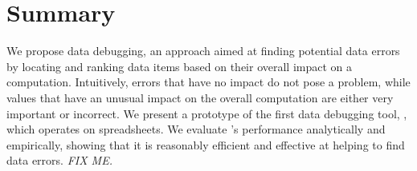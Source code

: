 \section{Summary}

We propose data debugging, an approach aimed at
finding potential data errors by locating and ranking data items based on their
overall impact on a computation. Intuitively, errors that have no
impact do not pose a problem, while values that have an unusual impact
on the overall computation are either very important or incorrect.
We present a prototype of the first data debugging
tool, \checkcell{}, which operates on spreadsheets. We evaluate
\checkcell{}'s performance analytically and empirically, showing that
it is reasonably efficient and effective at helping to find data
errors. \emph{FIX ME.}


